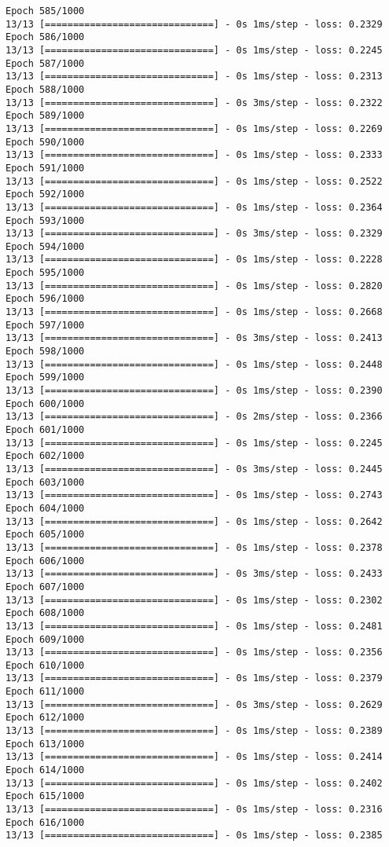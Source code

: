 \documentclass[11pt]{article}
\begin{document}
\begin{Verbatim}[commandchars=\\\{\}]
Epoch 585/1000
13/13 [==============================] - 0s 1ms/step - loss: 0.2329
Epoch 586/1000
13/13 [==============================] - 0s 1ms/step - loss: 0.2245
Epoch 587/1000
13/13 [==============================] - 0s 1ms/step - loss: 0.2313
Epoch 588/1000
13/13 [==============================] - 0s 3ms/step - loss: 0.2322
Epoch 589/1000
13/13 [==============================] - 0s 1ms/step - loss: 0.2269
Epoch 590/1000
13/13 [==============================] - 0s 1ms/step - loss: 0.2333
Epoch 591/1000
13/13 [==============================] - 0s 1ms/step - loss: 0.2522
Epoch 592/1000
13/13 [==============================] - 0s 1ms/step - loss: 0.2364
Epoch 593/1000
13/13 [==============================] - 0s 3ms/step - loss: 0.2329
Epoch 594/1000
13/13 [==============================] - 0s 1ms/step - loss: 0.2228
Epoch 595/1000
13/13 [==============================] - 0s 1ms/step - loss: 0.2820
Epoch 596/1000
13/13 [==============================] - 0s 1ms/step - loss: 0.2668
Epoch 597/1000
13/13 [==============================] - 0s 3ms/step - loss: 0.2413
Epoch 598/1000
13/13 [==============================] - 0s 1ms/step - loss: 0.2448
Epoch 599/1000
13/13 [==============================] - 0s 1ms/step - loss: 0.2390
Epoch 600/1000
13/13 [==============================] - 0s 2ms/step - loss: 0.2366
Epoch 601/1000
13/13 [==============================] - 0s 1ms/step - loss: 0.2245
Epoch 602/1000
13/13 [==============================] - 0s 3ms/step - loss: 0.2445
Epoch 603/1000
13/13 [==============================] - 0s 1ms/step - loss: 0.2743
Epoch 604/1000
13/13 [==============================] - 0s 1ms/step - loss: 0.2642
Epoch 605/1000
13/13 [==============================] - 0s 1ms/step - loss: 0.2378
Epoch 606/1000
13/13 [==============================] - 0s 3ms/step - loss: 0.2433
Epoch 607/1000
13/13 [==============================] - 0s 1ms/step - loss: 0.2302
Epoch 608/1000
13/13 [==============================] - 0s 1ms/step - loss: 0.2481
Epoch 609/1000
13/13 [==============================] - 0s 1ms/step - loss: 0.2356
Epoch 610/1000
13/13 [==============================] - 0s 1ms/step - loss: 0.2379
Epoch 611/1000
13/13 [==============================] - 0s 3ms/step - loss: 0.2629
Epoch 612/1000
13/13 [==============================] - 0s 1ms/step - loss: 0.2389
Epoch 613/1000
13/13 [==============================] - 0s 1ms/step - loss: 0.2414
Epoch 614/1000
13/13 [==============================] - 0s 1ms/step - loss: 0.2402
Epoch 615/1000
13/13 [==============================] - 0s 1ms/step - loss: 0.2316
Epoch 616/1000
13/13 [==============================] - 0s 1ms/step - loss: 0.2385

\end{Verbatim}
\end{document}
